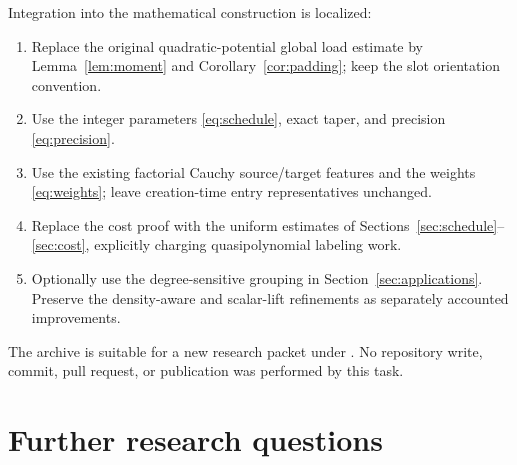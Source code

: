 \documentclass[11pt]{article}
\theoremstyle{remark}\newtheorem{remark}[theorem]{Remark}
\begin{document}
Integration into the mathematical construction is localized:
\begin{enumerate}[leftmargin=*]
\item Replace the original quadratic-potential global load estimate by Lemma~\ref{lem:moment} and Corollary~\ref{cor:padding}; keep the slot orientation convention.
\item Use the integer parameters \eqref{eq:schedule}, exact taper, and precision \eqref{eq:precision}.
\item Use the existing factorial Cauchy source/target features and the weights \eqref{eq:weights}; leave creation-time entry representatives unchanged.
\item Replace the cost proof with the uniform estimates of Sections~\ref{sec:schedule}--\ref{sec:cost}, explicitly charging quasipolynomial labeling work.
\item Optionally use the degree-sensitive grouping in Section~\ref{sec:applications}. Preserve the density-aware and scalar-lift refinements as separately accounted improvements.
\end{enumerate}
The archive is suitable for a new research packet under . No repository write, commit, pull request, or publication was performed by this task.

\section{Further research questions}
\label{sec:future}
\end{document}
